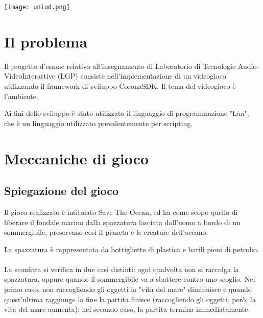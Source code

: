 \documentclass[12pt]{article}
\begin{document}
\begin{titlepage}



\texttt{[image: uniud.png]}\\[1cm] %
 

\vfill %

\end{titlepage}
\tableofcontents
\clearpage
\section{Il problema}
Il progetto d’esame relativo all’insegnamento di Laboratorio di Tecnologie Audio-VideoInterattive (LGP) consiste nell’implementazione di un videogioco utilizzando il framework di sviluppo CoronaSDK. Il tema del videogioco è l'ambiente. 

Ai fini dello sviluppo è stato utilizzato il linguaggio di programmazione "Lua", che è un linguaggio utilizzato prevalentemente per scripting.

\section{Meccaniche di gioco}
\subsection{Spiegazione del gioco}
Il gioco realizzato è intitolato Save The Ocean, ed ha come scopo quello di liberare il fondale marino dalla spazzatura lasciata dall'uomo a bordo di un sommergibile, preservano così il pianeta e le creature dell'oceano.

La spazzatura è rappresentata da bottigliette di plastica e barili pieni di petrolio.
\\\\

La sconfitta si verifica in due casi distinti: ogni qualvolta non si raccolga la spazzatura, oppure quando il sommergibile va a sbattere contro uno scoglio. Nel primo caso, non raccogliendo gli oggetti la "vita del mare" diminuisce e quando quest'ultima raggiunge la fine la partita finisce (raccogliendo gli oggetti, però, la vita del mare aumenta); nel secondo caso, la partita termina immediatamente. 
 
\end{document}
